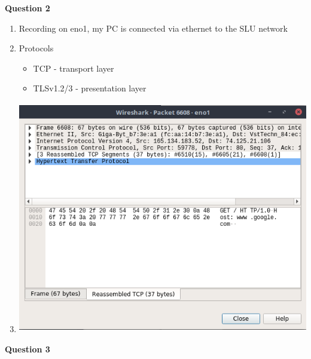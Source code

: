\documentclass[12pt]{article}
\begin{document}
	\noindent \textbf{Question 2}
	
	\begin{enumerate}[nolistsep]
		\item Recording on eno1, my PC is connected via ethernet to the SLU network
		\item Protocols
		
		\begin{itemize}[nolistsep, noitemsep]
			\item TCP - transport layer
			\item TLSv1.2/3 - presentation layer
		\end{itemize}
		\item 
		\includegraphics[height=4in]{2c}
	\end{enumerate}
	
	\noindent \textbf{Question 3}
	
\end{document}
